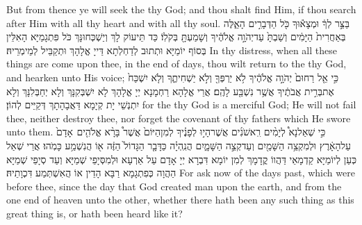 {But from thence ye will seek the \lord\space thy God; and thou shalt find Him, if thou search after Him with all thy heart and with all thy soul.}{}
{בַּצַּ֣ר לְךָ֔ וּמְצָא֕וּךָ כֹּ֖ל הַדְּבָרִ֣ים הָאֵ֑לֶּה בְּאַחֲרִית֙ הַיָּמִ֔ים וְשַׁבְתָּ֙ עַד\maqqaf יְהֹוָ֣ה אֱלֹהֶ֔יךָ וְשָׁמַעְתָּ֖ בְּקֹלֽוֹ׃}
{כַּד תֵּיעוֹק לָךְ וְיַשְׁכְּחוּנָּךְ כֹּל פִּתְגָמַיָּא הָאִלֵּין בְּסוֹף יוֹמַיָּא וּתְתוּב לְדַחְלְתָא דַּייָ אֱלָהָךְ וּתְקַבֵּיל לְמֵימְרֵיהּ׃}
{In thy distress, when all these things are come upon thee, in the end of days, thou wilt return to the \lord\space thy God, and hearken unto His voice;}{}
{כִּ֣י אֵ֤ל רַחוּם֙ יְהֹוָ֣ה אֱלֹהֶ֔יךָ לֹ֥א יַרְפְּךָ֖ וְלֹ֣א יַשְׁחִיתֶ֑ךָ וְלֹ֤א יִשְׁכַּח֙ אֶת\maqqaf בְּרִ֣ית אֲבֹתֶ֔יךָ אֲשֶׁ֥ר נִשְׁבַּ֖ע לָהֶֽם׃}
{אֲרֵי אֱלָהָא רַחְמָנָא יְיָ אֱלָהָךְ לָא יִשְׁבְּקִנָּךְ וְלָא יְחַבְּלִנָּךְ וְלָא יִתְנְשֵׁי יָת קְיָמָא דַּאֲבָהָתָךְ דְּקַיֵּים לְהוֹן׃}
{for the \lord\space thy God is a merciful God; He will not fail thee, neither destroy thee, nor forget the covenant of thy fathers which He swore unto them.}{}
{כִּ֣י שְׁאַל\maqqaf נָא֩ לְיָמִ֨ים רִֽאשֹׁנִ֜ים אֲשֶׁר\maqqaf הָי֣וּ לְפָנֶ֗יךָ לְמִן\maqqaf הַיּוֹם֙ אֲשֶׁר֩ בָּרָ֨א אֱלֹהִ֤ים \pasek  אָדָם֙ עַל\maqqaf הָאָ֔רֶץ וּלְמִקְצֵ֥ה הַשָּׁמַ֖יִם וְעַד\maqqaf קְצֵ֣ה הַשָּׁמָ֑יִם הֲנִֽהְיָ֗ה כַּדָּבָ֤ר הַגָּדוֹל֙ הַזֶּ֔ה א֖וֹ הֲנִשְׁמַ֥ע כָּמֹֽהוּ׃}
{אֲרֵי שְׁאַל כְּעַן לְיוֹמַיָּא קַדְמָאֵי דַּהֲווֹ קֳדָמָךְ לְמִן יוֹמָא דִּבְרָא יְיָ אָדָם עַל אַרְעָא וּלְמִסְּיָפֵי שְׁמַיָּא וְעַד סְיָפֵי שְׁמַיָּא הַהֲוָה כְּפִתְגָמָא רַבָּא הָדֵין אוֹ הֲאִשְׁתְּמַע דִּכְוָתֵיהּ׃}
{For ask now of the days past, which were before thee, since the day that God created man upon the earth, and from the one end of heaven unto the other, whether there hath been any such thing as this great thing is, or hath been heard like it?}{}
